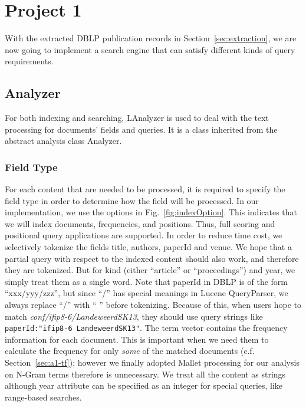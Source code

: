 \section{Project 1}\label{sec:proj1}

With the extracted DBLP publication records in Section~\ref{sec:extraction}, we are now going to implement a search engine that can satisfy different kinds of query requirements.

\subsection{Analyzer}

For both indexing and searching, \textsf{LAnalyzer} is used to deal with the text processing for documents' fields and queries. It is a class inherited from the abstract analysis class \textsf{Analyzer}.

\subsubsection{Field Type}

For each content that are needed to be processed, it is required to specify the field type in order to determine how the field will be processed. In our implementation, we use the options in Fig.~\ref{fig:indexOption}. This indicates that we will index documents, frequencies, and positions. Thus, full scoring and positional query applications are supported. In order to reduce time cost, we selectively tokenize the fields \textsf{title}, \textsf{authors}, \textsf{paperId} and \textsf{venue}. We hope that a partial query with respect to the indexed content should also work, and therefore they are tokenized. But for \textsf{kind} (either ``article'' or ``proceedings'') and year, we simply treat them as a single word. Note that \textsf{paperId} in DBLP is of the form ``xxx/yyy/zzz'', but since ``/'' has special meanings in Lucene \textsf{QueryParser}, we always replace ``/'' with `` '' before tokenizing. Because of this, when users hope to match \textit{conf/ifip8-6/LandeweerdSK13}, they should use query strings like \verb|paperId:"ifip8-6 LandeweerdSK13"|. The term vector contains the frequency information for each document. This is important when we need them to calculate the frequency for only \textit{some} of the matched documents (c.f. Section~\ref{sec:a1-tf}); however we finally adopted Mallet processing for our analysis on N-Gram terms therefore is unnecessary. We treat all the content as strings although \textsf{year} attribute can be specified as an integer for special queries, like range-based searches.

